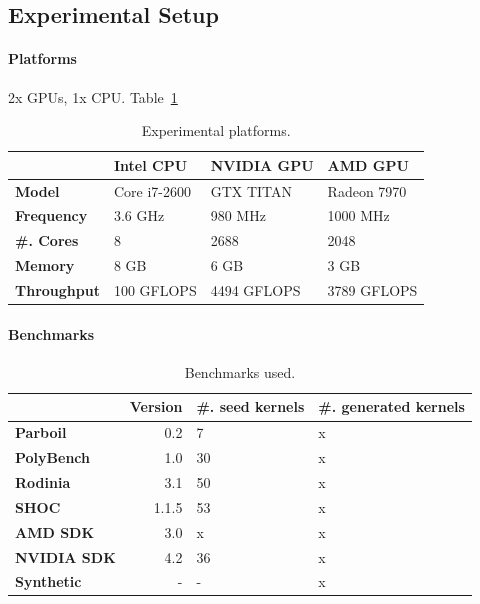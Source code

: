 \documentclass[preprint,nonatbib,10pt,nocopyrightspace]{sigplanconf}
\begin{document}
\subsection{Experimental Setup}\label{subsec:}

\paragraph{Platforms} 2x GPUs, 1x CPU. Table~\ref{tab:platforms}


\begin{table}%
\scriptsize
\centering
\begin{tabular}{l l l l}
  \toprule
  & \textbf{Intel CPU} & \textbf{NVIDIA GPU} & \textbf{AMD GPU} \\
  \midrule
  \textbf{Model} & Core i7-2600 & GTX TITAN & Radeon 7970 \\
  \textbf{Frequency} & 3.6 GHz & 980 MHz & 1000 MHz \\
  \textbf{\#. Cores} & 8 & 2688 & 2048 \\
  \textbf{Memory} & 8 GB & 6 GB & 3 GB \\
  \textbf{Throughput} & 100 GFLOPS & 4494 GFLOPS & 3789 GFLOPS \\
  \bottomrule
\end{tabular}
\caption{Experimental platforms.}
\label{tab:platforms}
\end{table}


\paragraph{Benchmarks}

\begin{table}%
\scriptsize
\centering
\begin{tabular}{l r R{2cm} R{2cm}}
  \toprule
  & \textbf{Version} & \textbf{\#. seed kernels} & \textbf{\#. generated kernels}\\
  \midrule
  \textbf{Parboil~\cite{Stratton2012}} & 0.2 & 7 & x \\
  \textbf{PolyBench~\cite{Grauer-Gray2012}} & 1.0 & 30 & x \\
  \textbf{Rodinia~\cite{Che2009}} & 3.1 & 50 & x \\
  \textbf{SHOC~\cite{Danalis2010}} & 1.1.5 & 53 & x \\
  \textbf{AMD SDK} & 3.0 & x & x \\
  \textbf{NVIDIA SDK} & 4.2 & 36 & x \\
  \textbf{Synthetic} & - & - & x \\
  \bottomrule
\end{tabular}
\caption{%
  Benchmarks used.
}
\label{tab:benchmarks}
\end{table}
\end{document}
